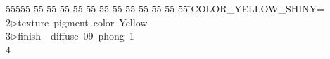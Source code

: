%
%
\begin{tabbing}
55555 \= 55 \= 55 \= 55 \= 55 \= 55 \= 55 \= 55 \= 55 \= 55 \= 55 \= 55 \= 55 \= \>COLOR\_YELLOW\_SHINY=\\[0pt]
2\>$\triangleright$\>texture\ pigment\ color\ Yellow\ \ \\[0pt]
3\>$\triangleright$\>finish\ \ diffuse\ 09\ phong\ 1\\[0pt]
4\>\end{tabbing}
